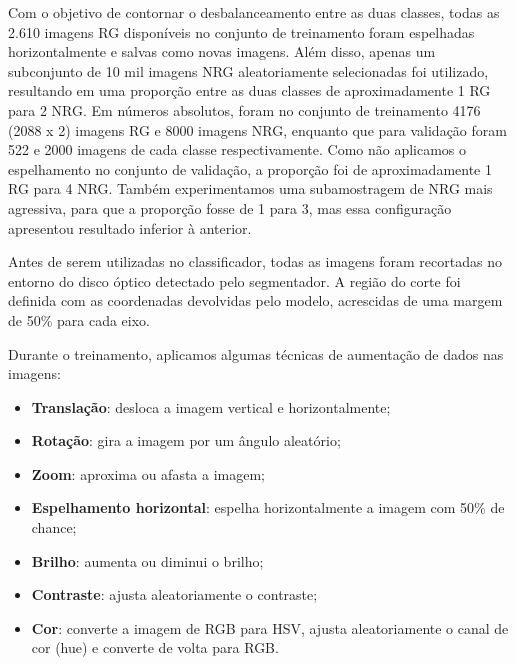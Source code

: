 \documentclass[12pt]{article}
\begin{document}

Com o objetivo de contornar o desbalanceamento entre as duas classes, todas as 2.610 imagens RG disponíveis no conjunto de treinamento foram espelhadas horizontalmente e salvas como novas imagens. Além disso, apenas um subconjunto de 10 mil imagens NRG aleatoriamente selecionadas foi utilizado, resultando em uma proporção entre as duas classes de aproximadamente 1 RG para 2 NRG. Em números absolutos, foram no conjunto de treinamento 4176 (2088 x 2) imagens RG e 8000 imagens NRG, enquanto que para validação foram 522 e 2000 imagens de cada classe respectivamente. Como não aplicamos o espelhamento no conjunto de validação, a proporção foi de aproximadamente 1 RG para 4 NRG. Também experimentamos uma subamostragem de NRG mais agressiva, para que a proporção fosse de 1 para 3, mas essa configuração apresentou resultado inferior à anterior.

Antes de serem utilizadas no classificador, todas as imagens foram recortadas no entorno do disco óptico detectado pelo segmentador. A região do corte foi definida com as coordenadas devolvidas pelo modelo, acrescidas de uma margem de 50\% para cada eixo.


Durante o treinamento, aplicamos algumas técnicas de aumentação de dados nas imagens:

\begin{itemize}[noitemsep]
    \item \textbf{Translação}: desloca a imagem vertical e horizontalmente;
    \item \textbf{Rotação}: gira a imagem por um ângulo aleatório;
    \item \textbf{Zoom}: aproxima ou afasta a imagem;
    \item \textbf{Espelhamento horizontal}: espelha horizontalmente a imagem com 50\% de chance;
    \item \textbf{Brilho}: aumenta ou diminui o brilho;
    \item \textbf{Contraste}: ajusta aleatoriamente o contraste;
    \item \textbf{Cor}: converte a imagem de RGB para HSV, ajusta aleatoriamente o canal de cor (hue) e converte de volta para RGB.
\end{itemize}
\end{document}
